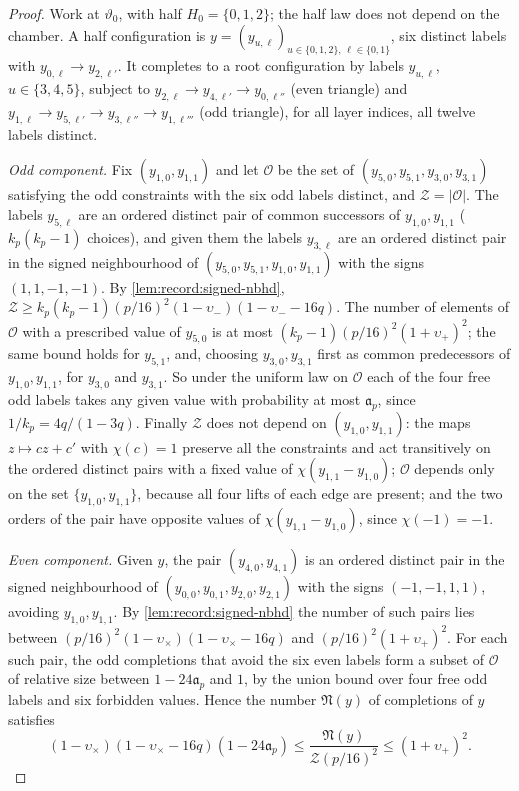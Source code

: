 \begin{proof}
Work at $\vartheta_0$, with half $H_0=\{0,1,2\}$; the half law does not depend
on the chamber. A half configuration is $y=(y_{u,\ell})_{u\in\{0,1,2\},\,\ell\in
\{0,1\}}$, six distinct labels with $y_{0,\ell}\to y_{2,\ell'}$. It completes to a
root configuration by labels $y_{u,\ell}$, $u\in\{3,4,5\}$, subject to
$y_{2,\ell}\to y_{4,\ell'}\to y_{0,\ell''}$ (even triangle) and
$y_{1,\ell}\to y_{5,\ell'}\to y_{3,\ell''}\to y_{1,\ell'''}$ (odd triangle), for all
layer indices, all twelve labels distinct.

\emph{Odd component.} Fix $(y_{1,0},y_{1,1})$ and let $\mathcal O$ be the set
of $(y_{5,0},y_{5,1},y_{3,0},y_{3,1})$ satisfying the odd constraints with the six
odd labels distinct, and $\mathcal Z=|\mathcal O|$. The labels $y_{5,\ell}$ are an
ordered distinct pair of common successors of $y_{1,0},y_{1,1}$ ($k_p(k_p-1)$
choices), and given them the labels $y_{3,\ell}$ are an ordered distinct pair in
the signed neighbourhood of $(y_{5,0},y_{5,1},y_{1,0},y_{1,1})$ with the signs
$(1,1,-1,-1)$. By \cref{lem:record:signed-nbhd},
$\mathcal Z\ge k_p(k_p-1)(p/16)^2(1-\upsilon_-)(1-\upsilon_--16q)$. The number of
elements of $\mathcal O$ with a prescribed value of $y_{5,0}$ is at most
$(k_p-1)(p/16)^2(1+\upsilon_+)^2$; the same bound holds for $y_{5,1}$, and,
choosing $y_{3,0},y_{3,1}$ first as common predecessors of $y_{1,0},y_{1,1}$, for
$y_{3,0}$ and $y_{3,1}$. So under the uniform law on $\mathcal O$ each of the four
free odd labels takes any given value with probability at most $\mathfrak a_p$,
since $1/k_p=4q/(1-3q)$. Finally $\mathcal Z$ does not depend on
$(y_{1,0},y_{1,1})$: the maps $z\mapsto cz+c'$ with $\chi(c)=1$ preserve all the
constraints and act transitively on the ordered distinct pairs with a fixed
value of $\chi(y_{1,1}-y_{1,0})$; $\mathcal O$ depends only on the set
$\{y_{1,0},y_{1,1}\}$, because all four lifts of each edge are present; and the
two orders of the pair have opposite values of $\chi(y_{1,1}-y_{1,0})$, since
$\chi(-1)=-1$.

\emph{Even component.} Given $y$, the pair $(y_{4,0},y_{4,1})$ is an ordered
distinct pair in the signed neighbourhood of $(y_{0,0},y_{0,1},y_{2,0},y_{2,1})$
with the signs $(-1,-1,1,1)$, avoiding $y_{1,0},y_{1,1}$. By
\cref{lem:record:signed-nbhd} the number of such pairs lies between
$(p/16)^2(1-\upsilon_\times)(1-\upsilon_\times-16q)$ and $(p/16)^2(1+\upsilon_+)^2$.
For each such pair, the odd
completions that avoid the six even labels form a subset of $\mathcal O$ of
relative size between $1-24\mathfrak a_p$ and $1$, by the union bound over four
free odd labels and six forbidden values. Hence the number $\mathfrak N(y)$ of
completions of $y$ satisfies
\begin{equation}\label{eq:record:root-count}
 (1-\upsilon_\times)(1-\upsilon_\times-16q)(1-24\mathfrak a_p)
 \le\frac{\mathfrak N(y)}{\mathcal Z(p/16)^2}\le(1+\upsilon_+)^2 .
\end{equation}


\end{proof}
